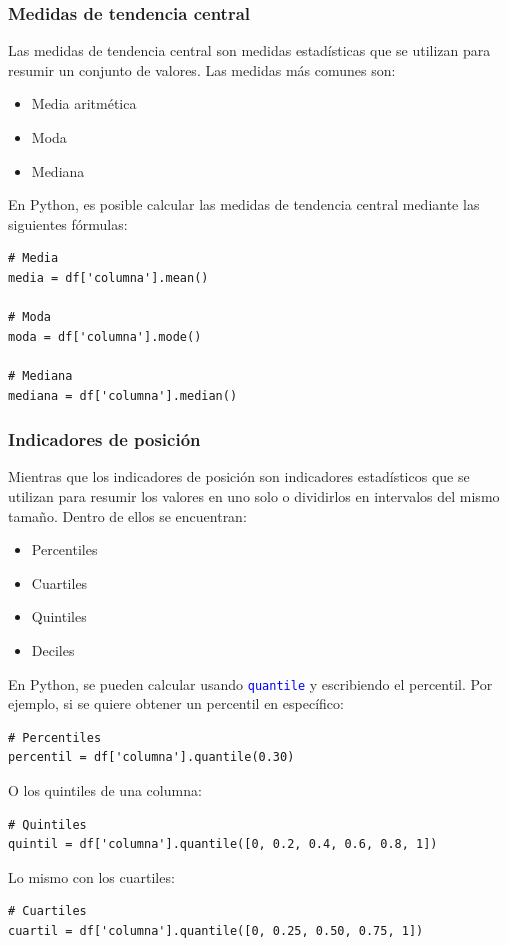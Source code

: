 \documentclass[a4paper, 12pt]{book}
\begin{document}
\subsubsection{Medidas de tendencia central}
Las medidas de tendencia central son medidas estadísticas que se utilizan para resumir un conjunto de valores. Las medidas más comunes son:

\begin{itemize}
	\item Media aritmética
	\item Moda
	\item Mediana
\end{itemize}

En Python, es posible calcular las medidas de tendencia central mediante las siguientes fórmulas:
\begin{verbatim}
# Media
media = df['columna'].mean()
	
# Moda
moda = df['columna'].mode()
	
# Mediana
mediana = df['columna'].median()
\end{verbatim}

\subsubsection{Indicadores de posición}
Mientras que los indicadores de posición son indicadores estadísticos que se utilizan para resumir los valores en uno solo o dividirlos en intervalos del mismo tamaño. Dentro de ellos se encuentran:
\begin{itemize}
	\item Percentiles
	\item Cuartiles
	\item Quintiles
	\item Deciles
\end{itemize}
En Python, se pueden calcular usando \texttt{\textcolor{blue}{quantile}} y escribiendo el percentil. Por ejemplo, si se quiere obtener un percentil en específico:
\begin{verbatim}
# Percentiles
percentil = df['columna'].quantile(0.30)
\end{verbatim}
O los quintiles de una columna:
\begin{verbatim}
# Quintiles
quintil = df['columna'].quantile([0, 0.2, 0.4, 0.6, 0.8, 1])
\end{verbatim}
Lo mismo con los cuartiles:
\begin{verbatim}
# Cuartiles
cuartil = df['columna'].quantile([0, 0.25, 0.50, 0.75, 1])
\end{verbatim}
\end{document}
